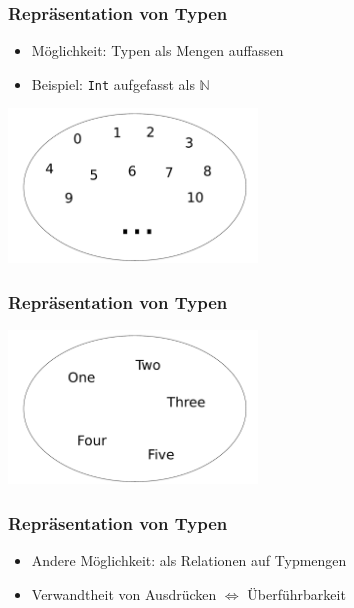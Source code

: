 \documentclass{beamer}
\begin{document}

\begin{frame}
\frametitle{Repräsentation von Typen}

\begin{itemize}
\item Möglichkeit: Typen als Mengen auffassen
\item Beispiel: \texttt{Int} aufgefasst als $\mathbb{N}$
\end{itemize}

\begin{center}
\includegraphics[width=250px]{menge-n}
\end{center}
\end{frame}


\begin{frame}
\frametitle{Repräsentation von Typen}

\begin{center}
\includegraphics[width=250px]{menge-onetofive}
\end{center}
\end{frame}


\begin{frame}
\frametitle{Repräsentation von Typen}

\begin{itemize}
\item Andere Möglichkeit: als Relationen auf Typmengen
\item Verwandtheit von Ausdrücken $\Leftrightarrow$ Überführbarkeit
\end{itemize}
\end{frame}
\end{document}
